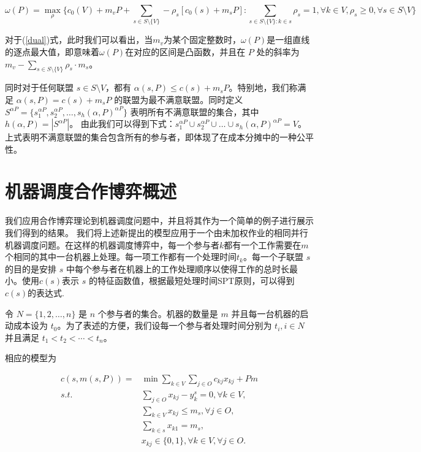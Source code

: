 \documentclass[UTF8]{article}
\begin{document}
\begin{equation} \label{dual}
  \omega(P)=\mathop{\max}_{\rho}\{c_0(V)+m_vP+\sum_{s\in S\setminus\{V\}}-\rho_s[c_0(s)+m_sP]:\sum_{s\in S\setminus\{V\}:k\in s}\rho_s=1,\forall k \in V,\rho_s\geq 0,\forall s \in S \setminus{V}\}
\end{equation}

对于(\ref{dual})式，此时我们可以看出，当$m_v $为某个固定整数时，$\omega(P)$是一组直线的逐点最大值，即意味着$\omega(P) $在对应的区间是凸函数，并且在 $P$ 处的斜率为 $m_v-\sum_{s\in S \setminus\{V\}} \rho_s \cdot m_s$。

同时对于任何联盟 $s\in S\setminus{V}$，都有 $\alpha(s,P)\leq c(s)+m_sP$。特别地，我们称满足 $\alpha(s,P)=c(s)+m_sP$ 的联盟为最不满意联盟。同时定义 $S^{\alpha P}=\{s_1^{\alpha P},s_2^{\alpha P},\dots,s_h(\alpha,P)^{\alpha P}\}$ 表明所有不满意联盟的集合，其中 $h(\alpha,P)=|S^{\alpha P}|$。
由此我们可以得到下式：$s_1^{\alpha P}\cup s_2^{\alpha P}\cup\dots\cup s_h(\alpha,P)^{\alpha P}=V$。上式表明不满意联盟的集合包含所有的参与者，即体现了在成本分摊中的一种公平性。

\section{机器调度合作博弈概述}
我们应用合作博弈理论到机器调度问题中，并且将其作为一个简单的例子进行展示我们得到的结果。
我们将上述新提出的模型应用于一个由未加权作业的相同并行机器调度问题。在这样的机器调度博弈中，每一个参与者$k$都有一个工作需要在$m$个相同的其中一台机器上处理。每一项工作都有一个处理时间$t_k$。每一个子联盟 $s$ 的目的是安排 $s$ 中每个参与者在机器上的工作处理顺序以使得工作的总时长最小。使用$c(s)$表示 $s$ 的特征函数值，根据最短处理时间SPT原则，可以得到$c(s)$的表达式.

令 $N=\{1,2,\ldots,n\}$ 是 $n$ 个参与者的集合。机器的数量是 $m$ 并且每一台机器的启动成本设为 $t_0$。为了表述的方便，我们设每一个参与者处理时间分别为 $t_i, i\in N$ 并且满足 $t_1<t_2<\cdots<t_n$。

相应的模型为

\begin{center}
\[
\begin{aligned}

c(s,m(s,P)) = & {\min} \sum_{k\in V}\sum_{j\in O} c_{kj} x_{kj} + Pm \\

{s.t.} & \sum_{j \in O} x_{kj}-y_k^s=0, \forall k \in V, \\
 & \sum_{k\in V} x_{kj} \leq m_s,\forall j \in O,  \\
& \sum_{k\in s} x_{k1}=m_s, \\

& x_{kj} \in \{0,1\} , \forall k \in V, \forall j \in O.
\end{aligned}
\]
\end{center}
\end{document}
